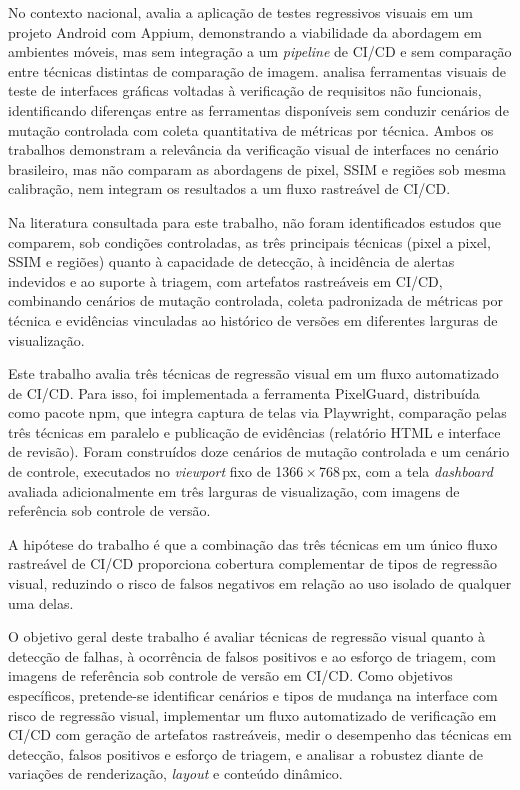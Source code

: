 \documentclass{UNESC}
\begin{document}
No contexto nacional,  avalia a aplicação de testes regressivos visuais em um projeto Android com Appium, demonstrando a viabilidade da abordagem em ambientes móveis, mas sem integração a um \emph{pipeline} de CI/CD e sem comparação entre técnicas distintas de comparação de imagem.  analisa ferramentas visuais de teste de interfaces gráficas voltadas à verificação de requisitos não funcionais, identificando diferenças entre as ferramentas disponíveis sem conduzir cenários de mutação controlada com coleta quantitativa de métricas por técnica. Ambos os trabalhos demonstram a relevância da verificação visual de interfaces no cenário brasileiro, mas não comparam as abordagens de pixel, SSIM e regiões sob mesma calibração, nem integram os resultados a um fluxo rastreável de CI/CD.

Na literatura consultada para este trabalho, não foram identificados estudos que comparem, sob condições controladas, as três principais técnicas (pixel a pixel, SSIM e regiões) quanto à capacidade de detecção, à incidência de alertas indevidos e ao suporte à triagem, com artefatos rastreáveis em CI/CD, combinando cenários de mutação controlada, coleta padronizada de métricas por técnica e evidências vinculadas ao histórico de versões em diferentes larguras de visualização.

Este trabalho avalia três técnicas de regressão visual em um fluxo automatizado de CI/CD. Para isso, foi implementada a ferramenta PixelGuard, distribuída como pacote npm, que integra captura de telas via Playwright, comparação pelas três técnicas em paralelo e publicação de evidências (relatório HTML e interface de revisão). Foram construídos doze cenários de mutação controlada e um cenário de controle, executados no \emph{viewport} fixo de 1366\,×\,768\,px, com a tela \emph{dashboard} avaliada adicionalmente em três larguras de visualização, com imagens de referência sob controle de versão.

A hipótese do trabalho é que a combinação das três técnicas em um único fluxo rastreável de CI/CD proporciona cobertura complementar de tipos de regressão visual, reduzindo o risco de falsos negativos em relação ao uso isolado de qualquer uma delas.

O objetivo geral deste trabalho é avaliar técnicas de regressão visual quanto à detecção de falhas, à ocorrência de falsos positivos e ao esforço de triagem, com imagens de referência sob controle de versão em CI/CD. Como objetivos específicos, pretende-se identificar cenários e tipos de mudança na interface com risco de regressão visual, implementar um fluxo automatizado de verificação em CI/CD com geração de artefatos rastreáveis, medir o desempenho das técnicas em detecção, falsos positivos e esforço de triagem, e analisar a robustez diante de variações de renderização, \emph{layout} e conteúdo dinâmico.
\end{document}
